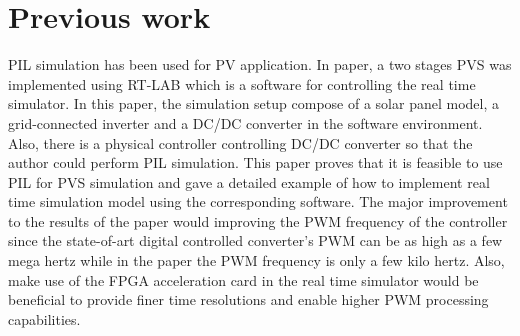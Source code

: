 \section{Previous work}
\gls{PIL} simulation has been used for \gls{PV} application. In paper,\cite{RN11} a two stages \gls{PVS} was implemented using RT-LAB which is a software for controlling the real time simulator. In this paper, the simulation setup compose of a solar panel model, a grid-connected inverter and a DC/DC converter in the software environment. Also, there is a physical controller controlling DC/DC converter so that the author could perform \gls{PIL} simulation. This paper proves that it is feasible to use \gls{PIL} for \gls{PVS} simulation and gave a detailed example of how to implement real time simulation model using the corresponding software. The major improvement to the results of the paper would improving the \gls{PWM} frequency of the controller since the state-of-art digital controlled converter's \gls{PWM} can be as high as a few mega hertz while in the paper the \gls{PWM} frequency is only a few kilo hertz. Also, make use of the \gls{FPGA} acceleration card in the real time simulator would be beneficial to provide finer time resolutions and enable higher \gls{PWM} processing capabilities.
